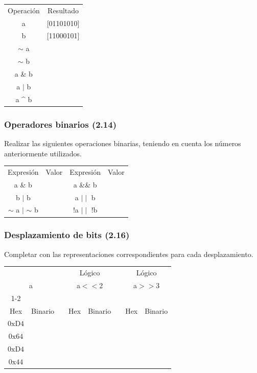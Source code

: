 \begin{tabular}{cc}
  Operación&Resultado\\
  a&[01101010]\\
  b&[11000101]\\
  $\sim$ a&\underspace \\
  $\sim$ b&\underspace \\
  a \& b&\underspace\\
  a $\mid$ b&\underspace\\
  a \^{} b&\underspace\\
\end{tabular}

\subsubsection{Operadores binarios (2.14)}
Realizar las siguientes operaciones binarias, teniendo en cuenta los números anteriormente utilizados.\\

\begin{tabular}{cccc}
  Expresión&Valor&Expresión&Valor\\
  a \& b&\underspace &a \&\& b &\underspace\\
  b $\mid$ b&\underspace& a $\mid\mid$ b &\underspace\\
  $\sim$ a $\mid$ $\sim$ b&\underspace& !a $\mid\mid$ !b &\underspace \\
\end{tabular}


\subsubsection{Desplazamiento de bits (2.16)}
Completar con las representaciones correspondientes para cada desplazamiento.\\

\begin{tabular}{cccccccc}
  \multicolumn{2}{c}{ }& &\multicolumn{2}{c}{Lógico}& &\multicolumn{2}{c}{Lógico}\\
  \multicolumn{2}{c}{a}& &\multicolumn{2}{c}{a$<<$2}& &\multicolumn{2}{c}{a$>>$3}\\
  \cline{1-2}\cline{4-5}\cline{7-8}\\
  Hex&Binario&&Hex&Binario&&Hex&Binario\\
  $\mathrm{0xD4}$&\underspace&&\underspace &\underspace &&\underspace &\underspace\\
  $\mathrm{0x64}$&\underspace&&\underspace &\underspace &&\underspace &\underspace\\
  $\mathrm{0xD4}$&\underspace&&\underspace &\underspace &&\underspace &\underspace\\
  $\mathrm{0x44}$&\underspace&&\underspace &\underspace &&\underspace &\underspace\\
\end{tabular}


